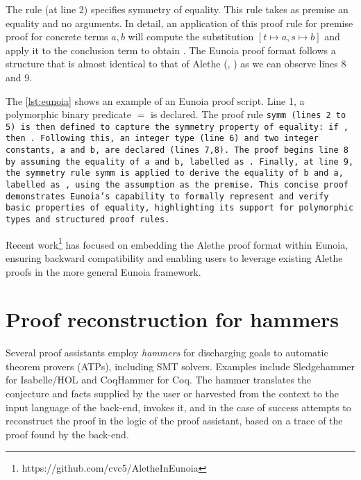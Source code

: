 The rule  (at line 2) specifies symmetry of equality. This rule takes as premise an equality  and no arguments.
In detail, an application of this proof rule for premise proof  for concrete terms $a,b$ will compute the substitution $[t \mapsto a, s \mapsto b]$ and apply it to the conclusion term to obtain .
The Eunoia proof format follows a structure that is almost identical to that of Alethe (, ) as we can observe lines 8 and 9.

The \cref{lst:eunoia} shows an example of an Eunoia proof script. Line 1, a polymorphic binary predicate $=$ is declared.
The proof rule \tt{symm} (lines 2 to 5) is then defined to capture the symmetry property of equality: if , then .
Following this, an integer type  (line 6) and two integer constants, \tt{a} and \tt{b}, are declared (lines 7,8).
The proof begins line 8 by assuming the equality of \tt{a} and \tt{b}, labelled as .
Finally, at line 9, the symmetry rule \tt{symm} is applied to derive the equality of \tt{b} and \tt{a}, labelled as , using the assumption  as the premise.
This concise proof demonstrates Eunoia's capability to formally represent and verify basic properties of equality, highlighting its support for polymorphic types and structured proof rules.

Recent work\footnote{https://github.com/cvc5/AletheInEunoia} has focused on embedding the Alethe proof format within Eunoia, ensuring backward compatibility and enabling users to leverage existing Alethe proofs in the more general Eunoia framework.

\section{Proof reconstruction for hammers}

Several proof assistants employ \emph{hammers} for discharging goals to automatic theorem provers (ATPs), including SMT solvers. Examples include Sledgehammer \cite{Sledgehammer} for Isabelle/HOL and CoqHammer \cite{coqhammer1,coqhammer2} for Coq.
The hammer translates the conjecture and facts supplied by the user or harvested
from the context to the input language of the back-end, invokes it, and in the
case of success attempts to reconstruct the proof in the logic of the proof
assistant, based on a trace of the proof found by the back-end.

